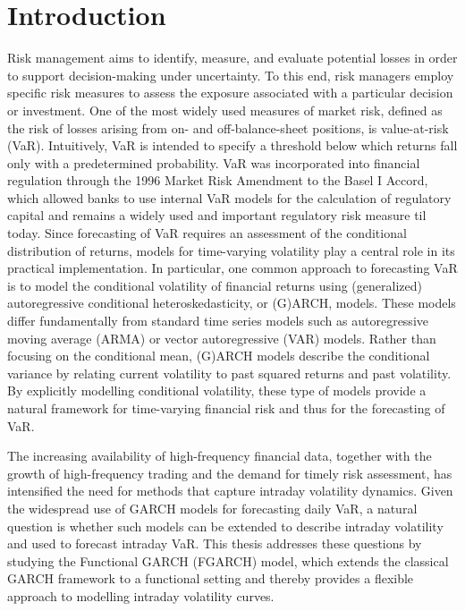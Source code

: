 \documentclass[12pt,a4paper]{article}
\theoremstyle{definition}
\begin{document}
\section{Introduction}
\label{sec:Introduction}
Risk management aims to identify, measure, and evaluate potential losses in order to support decision-making under uncertainty. To this end, risk managers employ specific risk measures to assess the exposure associated with a particular decision or investment. One of the most widely used measures of market risk, defined as the risk of losses arising from on- and off-balance-sheet positions, is value-at-risk (VaR). Intuitively, VaR is intended to specify a threshold below which returns fall only with a predetermined probability. VaR was incorporated into financial regulation through the 1996 Market Risk Amendment to the Basel I Accord, which allowed banks to use internal VaR models for the calculation of regulatory capital and remains a widely used and important regulatory risk measure til today. Since forecasting of VaR requires an assessment of the conditional distribution of returns, models for time-varying volatility play a central role in its practical implementation. In particular, one common approach to forecasting VaR is to model the conditional volatility of financial returns using (generalized) autoregressive conditional heteroskedasticity, or (G)ARCH, models. These models differ fundamentally from standard time series models such as autoregressive moving average (ARMA) or vector autoregressive (VAR) models. Rather than focusing on the conditional mean, (G)ARCH models describe the conditional variance by relating current volatility to past squared returns and past volatility. By explicitly modelling conditional volatility, these type of models provide a natural framework for time-varying financial risk and thus for the forecasting of VaR. 

The increasing availability of high-frequency financial data, together with the growth of high-frequency trading \citep{HFTLiterature, HFTTrading, huang2025global, CFTC2019AutomatedOrders, BouveretEtAl2014HFT} and the demand for timely risk assessment, has intensified the need for methods that capture intraday volatility dynamics. Given the widespread use of GARCH models for forecasting daily VaR, a natural question is whether such models can be extended to describe intraday volatility and used to forecast intraday VaR. This thesis addresses these questions by studying the Functional GARCH (FGARCH) model, which extends the classical GARCH framework to a functional setting and thereby provides a flexible approach to modelling intraday volatility curves.
\end{document}
